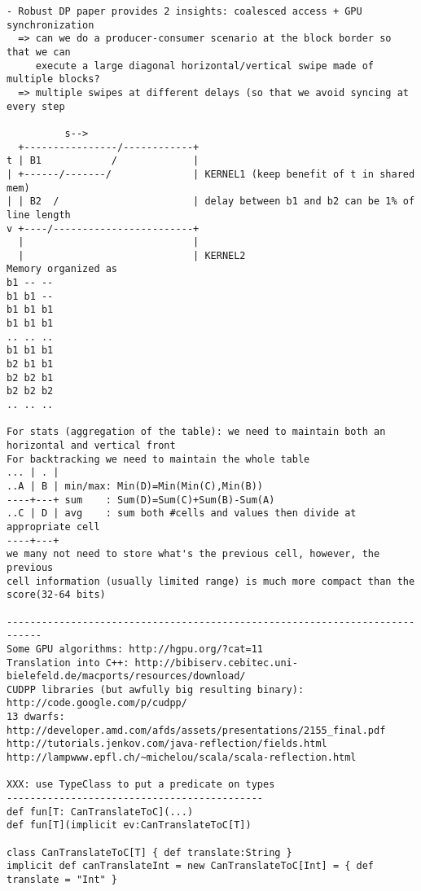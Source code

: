 \documentclass[11pt]{article}
\begin{document}
\begin{verbatim}
- Robust DP paper provides 2 insights: coalesced access + GPU synchronization
  => can we do a producer-consumer scenario at the block border so that we can
     execute a large diagonal horizontal/vertical swipe made of multiple blocks?
  => multiple swipes at different delays (so that we avoid syncing at every step

          s-->
  +----------------/------------+
t | B1            /             |
| +------/-------/              | KERNEL1 (keep benefit of t in shared mem)
| | B2  /                       | delay between b1 and b2 can be 1% of line length
v +----/------------------------+
  |                             |
  |                             | KERNEL2
Memory organized as
b1 -- --
b1 b1 --
b1 b1 b1
b1 b1 b1
.. .. ..
b1 b1 b1
b2 b1 b1
b2 b2 b1
b2 b2 b2
.. .. ..

For stats (aggregation of the table): we need to maintain both an horizontal and vertical front
For backtracking we need to maintain the whole table
... | . |
..A | B | min/max: Min(D)=Min(Min(C),Min(B))
----+---+ sum    : Sum(D)=Sum(C)+Sum(B)-Sum(A)
..C | D | avg    : sum both #cells and values then divide at appropriate cell
----+---+
we many not need to store what's the previous cell, however, the previous
cell information (usually limited range) is much more compact than the score(32-64 bits)

----------------------------------------------------------------------------
Some GPU algorithms: http://hgpu.org/?cat=11
Translation into C++: http://bibiserv.cebitec.uni-bielefeld.de/macports/resources/download/
CUDPP libraries (but awfully big resulting binary): http://code.google.com/p/cudpp/
13 dwarfs: http://developer.amd.com/afds/assets/presentations/2155_final.pdf
http://tutorials.jenkov.com/java-reflection/fields.html
http://lampwww.epfl.ch/~michelou/scala/scala-reflection.html

XXX: use TypeClass to put a predicate on types
--------------------------------------------
def fun[T: CanTranslateToC](...)
def fun[T](implicit ev:CanTranslateToC[T])

class CanTranslateToC[T] { def translate:String }
implicit def canTranslateInt = new CanTranslateToC[Int] = { def translate = "Int" }
\end{verbatim}

\newpage


\end{document}
